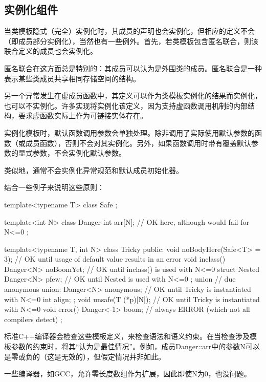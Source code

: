 \subsection{实例化组件}

当类模板隐式（完全）实例化时，其成员的声明也会实例化，但相应的定义不会（即成员部分实例化），当然也有一些例外。首先，若类模板包含匿名联合，则该联合定义的成员也会实例化。

\begin{notice}
匿名联合在这方面总是特别的：其成员可以认为是外围类的成员。匿名联合是一种表示某些类成员共享相同存储空间的结构。
\end{notice}

另一个异常发生在虚成员函数中，其定义可以作为类模板实例化的结果而实例化，也可以不实例化。许多实现将实例化该定义，因为支持虚函数调用机制的内部结构，要求虚函数实际上作为可链接实体存在。 

实例化模板时，默认函数调用参数会单独处理。除非调用了实际使用默认参数的函数（或成员函数），否则不会对其实例化。另外，如果函数调用时带有覆盖默认参数的显式参数，不会实例化默认参数。

类似地，通常不会实例化异常规范和默认成员初始化器。

结合一些例子来说明这些原则：

\begin{cpp}
template<typename T>
class Safe {
};

template<int N>
class Danger {
	int arr[N]; // OK here, although would fail for N<=0
};

template<typename T, int N>
class Tricky {
	public:
	void noBodyHere(Safe<T> = 3); // OK until usage of default value results in an error
	void inclass() {
		Danger<N> noBoomYet; // OK until inclass() is used with N<=0
	}
	struct Nested {
		Danger<N> pfew; // OK until Nested is used with N<=0
	};
	union { // due anonymous union:
		Danger<N> anonymous; // OK until Tricky is instantiated with N<=0
		int align;
	};
	void unsafe(T (*p)[N]); // OK until Tricky is instantiated with N<=0
	void error() {
		Danger<-1> boom; // always ERROR (which not all compilers detect)
	}
};
\end{cpp}

标准C++编译器会检查这些模板定义，来检查语法和语义约束。在当检查涉及模板参数的约束时，将其“认为是最佳情况”。例如，成员Danger::arr中的参数N可以是零或负的（这是无效的），但假定情况并非如此。

\begin{notice}
一些编译器，如GCC，允许零长度数组作为扩展，因此即使N为0，也没问题。
\end{notice}

